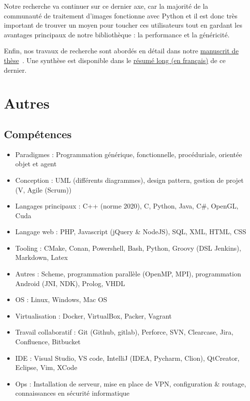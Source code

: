 \documentclass[11pt,a4paper,sans]{article} %
\begin{document}
Notre recherche va continuer sur ce dernier axe, car la majorité de la communauté de traitement d'images fonctionne avec
Python et il est donc très important de trouver un moyen pour toucher ces utilisateurs tout en gardant les avantages
principaux de notre bibliothèque : la performance et la généricité.

Enfin, nos travaux de recherche sont abordés en détail dans notre
\href{https://dutiona.github.io/thesis/manuscript.pdf}{manuscrit de thèse}~\parencite{roynard.2022.phd}. Une synthèse
est disponible dans le \href{https://dutiona.github.io/thesis/resume_long.pdf}{résumé long (en français)} de ce dernier.

\clearpage

\renewcommand{\refname}{Publications}
%
\printbibliography[heading=bibintoc]

\clearpage

\section{Autres}

\subsection{Compétences}

\begin{itemize}
  \item Paradigmes : Programmation générique, fonctionnelle, procéduriale, orientée objet et agent
  \item Conception : UML (différents diagrammes), design pattern, gestion de projet (V, Agile (Scrum))
  \item Langages principaux : C++ (norme 2020), C, Python, Java, C\#, OpenGL, Cuda
  \item Langage web : PHP, Javascript (jQuery \& NodeJS), SQL, XML, HTML, CSS
  \item Tooling : CMake, Conan, Powershell, Bash, Python, Groovy (DSL Jenkins), Markdown, Latex
  \item Autres : Scheme, programmation parallèle (OpenMP, MPI), programmation Android (JNI, NDK), Prolog, VHDL
  \item OS : Linux, Windows, Mac OS
  \item Virtualisation : Docker, VirtualBox, Packer, Vagrant
  \item Travail collaboratif : Git (Github, gitlab), Perforce, SVN, Clearcase, Jira, Confluence, Bitbucket
  \item IDE : Visual Studio, VS code, IntelliJ (IDEA, Pycharm, Clion), QtCreator, Eclipse, Vim, XCode
  \item Ops : Installation de serveur,  mise en place de VPN, configuration \& routage, connaissances en sécurité
        informatique
\end{itemize}
\end{document}
